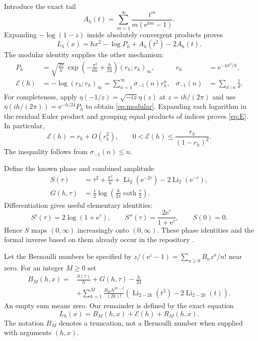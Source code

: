 \documentclass[11pt,a4paper]{article}
\newcommand{\ee}{\mathrm e}
\newcommand{\Li}{\operatorname{Li}}
\newcommand{\E}{\mathcal E}
\newcommand{\qpoch}[2]{(#1;#2)_\infty}
\numberwithin{equation}{section}
\theoremstyle{plain}
\theoremstyle{definition}
\theoremstyle{remark}
\begin{document}
Introduce the exact tail
\begin{equation}
 A_h(t)=\sum_{m=1}^{\infty}\frac{t^m}{m(\ee^{hm}-1)}.
 \label{eq:A}
\end{equation}
Expanding $-\log(1-z)$ inside absolutely convergent products proves
\begin{equation}
 L_h(x)=hx^2-\log P_h+A_h(t^2)-2A_h(t).
 \label{eq:exactL}
\end{equation}
The modular identity supplies the other mechanism:
\begin{align}
 P_h&=\sqrt{\frac{2\pi}{h}}\,
       \exp\left(-\frac{\pi^2}{6h}+\frac h{24}\right)
       \qpoch{r_h}{r_h},&
 r_h&=\ee^{-4\pi^2/h},\label{eq:modular}\\
 \E(h)&=-\log\qpoch{r_h}{r_h}
        =\sum_{n=1}^{\infty}\sigma_{-1}(n)r_h^n,&
 \sigma_{-1}(n)&=\sum_{d\mid n}\frac1d.\label{eq:E}
\end{align}
For completeness, apply $\eta(-1/z)=\sqrt{-iz}\eta(z)$ at
$z=ih/(2\pi)$ and use $\eta(ih/(2\pi))=\ee^{-h/24}P_h$ to obtain
\eqref{eq:modular}. Expanding each logarithm in the residual Euler product
and grouping equal products of indices proves \eqref{eq:E}. In particular,
\begin{equation}
 \E(h)=r_h+O(r_h^2),\qquad
 0<\E(h)\le\frac{r_h}{(1-r_h)^2}.
 \label{eq:Ebound}
\end{equation}
The inequality follows from $\sigma_{-1}(n)\le n$.

Define the known phase and combined amplitude
\begin{align}
 S(\tau)&=\tau^2+\frac{\pi^2}{6}
          +\Li_2(\ee^{-2\tau})-2\Li_2(\ee^{-\tau}),\label{eq:S}\\
 G(h,\tau)&=\frac12\log\left(\frac{h}{2\pi}
                                  \coth\frac\tau2\right).\label{eq:G}
\end{align}
Differentiation gives useful elementary identities:
\begin{equation}
 S'(\tau)=2\log(1+\ee^\tau),\qquad
 S''(\tau)=\frac{2\ee^\tau}{1+\ee^\tau},\qquad S(0)=0.
 \label{eq:Sder}
\end{equation}
Hence $S$ maps $(0,\infty)$ increasingly onto $(0,\infty)$. These phase
identities and the formal inverse based on them already occur in the
repository \cite{repo}.

Let the Bernoulli numbers be specified by
$z/(\ee^z-1)=\sum_{n\ge0}B_nz^n/n!$ near zero. For an integer $M\ge0$ set
\begin{align}
 B_M(h,x)={}&\frac{S(\tau)}h+G(h,\tau)-\frac h{24}\nonumber\\
 &+\sum_{k=1}^{M}\frac{B_{2k}h^{2k-1}}{(2k)!}
       \left(\Li_{2-2k}(t^2)-2\Li_{2-2k}(t)\right).
 \label{eq:BM}
\end{align}
An empty sum means zero. Our remainder is defined by the exact equation
\begin{equation}
 L_h(x)=B_M(h,x)+\E(h)+R_M(h,x).
 \label{eq:Rdef}
\end{equation}
The notation $B_M$ denotes a truncation, not a Bernoulli number when supplied
with arguments $(h,x)$.
\end{document}
